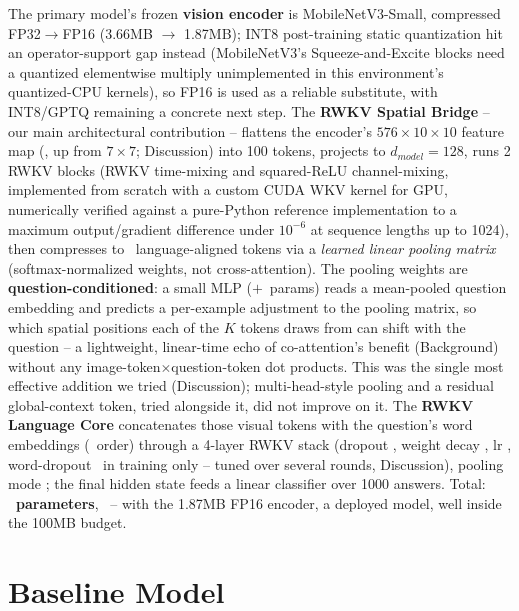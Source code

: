 \documentclass[final]{article}
\begin{document}
The primary model's frozen \textbf{vision encoder} is MobileNetV3-Small, compressed
FP32$\to$FP16 (3.66MB $\to$ 1.87MB); INT8 post-training static quantization hit an
operator-support gap instead (MobileNetV3's Squeeze-and-Excite blocks need a quantized
elementwise multiply unimplemented in this environment's quantized-CPU kernels), so FP16 is used
as a reliable substitute, with INT8/GPTQ \citep{frantar2023gptq} remaining a concrete next step.
The \textbf{RWKV Spatial Bridge} -- our main architectural contribution -- flattens the encoder's
$576\times10\times10$ feature map (\primaryResolution, up from $7{\times}7$; Discussion) into 100
tokens, projects to $d_{model}=128$, runs 2 RWKV blocks (RWKV time-mixing and squared-ReLU
channel-mixing, implemented from scratch with a custom CUDA WKV kernel for GPU, numerically
verified against a pure-Python reference implementation to a maximum output/gradient difference
under $10^{-6}$ at sequence lengths up to 1024), then compresses to \primaryTunedK\
language-aligned tokens via a \emph{learned linear pooling matrix} (softmax-normalized weights,
not cross-attention). The pooling weights are \textbf{question-conditioned}: a small MLP
($+$\qCondExtraParams\ params) reads a mean-pooled question embedding and predicts a per-example
adjustment to the pooling matrix, so which spatial positions each of the $K$ tokens draws from can
shift with the question -- a lightweight, linear-time echo of co-attention's benefit (Background)
without any image-token$\times$question-token dot products. This was the single most effective
addition we tried (Discussion); multi-head-style pooling and a residual global-context token,
tried alongside it, did not improve on it. The \textbf{RWKV Language Core} concatenates those
visual tokens with the question's word embeddings (\primaryTunedTokenOrder\ order) through a
4-layer RWKV stack (dropout \primaryTunedDropout, weight decay \primaryTunedWeightDecay, lr
\primaryTunedLR, word-dropout \primaryTunedWordDropout\ in training only -- tuned over several
rounds, Discussion), pooling mode \primaryTunedPool; the final hidden state feeds a linear
classifier over 1000 answers. Total: \textbf{\primaryParams\ parameters}, \primarySize\ -- with the
1.87MB FP16 encoder, a \textbf{\primaryTotalSize} deployed model, well inside the 100MB budget.

\section*{Baseline Model}
\end{document}
